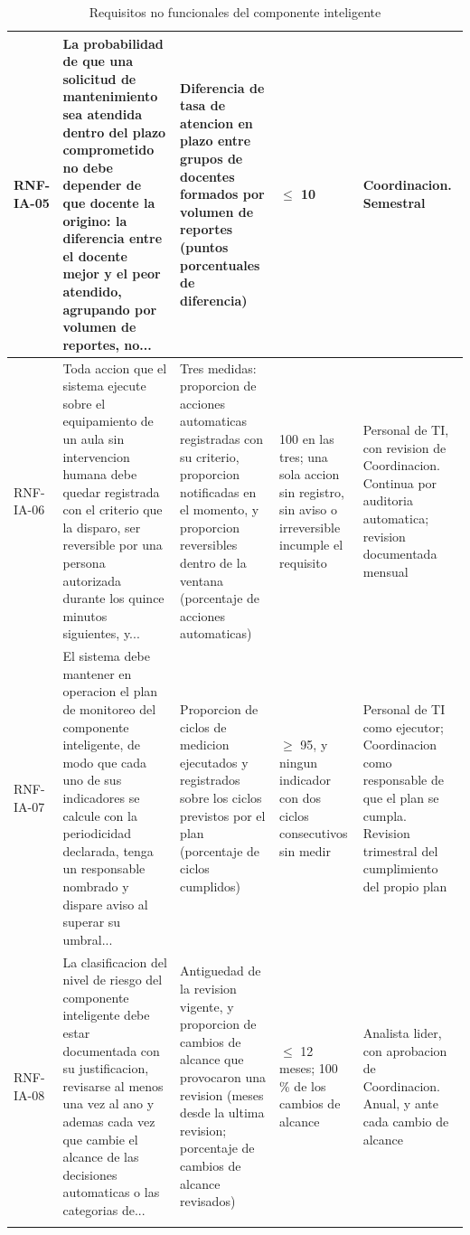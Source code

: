 \begin{longtable}{|p{1.6cm}|p{4.4cm}|p{2.5cm}|p{2.2cm}|p{2.6cm}|}
RNF-IA-05 & La probabilidad de que una solicitud de mantenimiento sea atendida dentro del plazo comprometido no debe depender de que docente la origino: la diferencia entre el docente mejor y el peor atendido, agrupando por volumen de reportes, no... & Diferencia de tasa de atencion en plazo entre grupos de docentes formados por volumen de reportes (puntos porcentuales de diferencia) & $\leq$ 10 & Coordinacion. Semestral \\ \hline
RNF-IA-06 & Toda accion que el sistema ejecute sobre el equipamiento de un aula sin intervencion humana debe quedar registrada con el criterio que la disparo, ser reversible por una persona autorizada durante los quince minutos siguientes, y... & Tres medidas: proporcion de acciones automaticas registradas con su criterio, proporcion notificadas en el momento, y proporcion reversibles dentro de la ventana (porcentaje de acciones automaticas) & 100 en las tres; una sola accion sin registro, sin aviso o irreversible incumple el requisito & Personal de TI, con revision de Coordinacion. Continua por auditoria automatica; revision documentada mensual \\ \hline
RNF-IA-07 & El sistema debe mantener en operacion el plan de monitoreo del componente inteligente, de modo que cada uno de sus indicadores se calcule con la periodicidad declarada, tenga un responsable nombrado y dispare aviso al superar su umbral... & Proporcion de ciclos de medicion ejecutados y registrados sobre los ciclos previstos por el plan (porcentaje de ciclos cumplidos) & $\geq$ 95, y ningun indicador con dos ciclos consecutivos sin medir & Personal de TI como ejecutor; Coordinacion como responsable de que el plan se cumpla. Revision trimestral del cumplimiento del propio plan \\ \hline
RNF-IA-08 & La clasificacion del nivel de riesgo del componente inteligente debe estar documentada con su justificacion, revisarse al menos una vez al ano y ademas cada vez que cambie el alcance de las decisiones automaticas o las categorias de... & Antiguedad de la revision vigente, y proporcion de cambios de alcance que provocaron una revision (meses desde la ultima revision; porcentaje de cambios de alcance revisados) & $\leq$ 12 meses; 100 \% de los cambios de alcance & Analista lider, con aprobacion de Coordinacion. Anual, y ante cada cambio de alcance \\ \hline
\caption{Requisitos no funcionales del componente inteligente}
\end{longtable}
\endgroup


